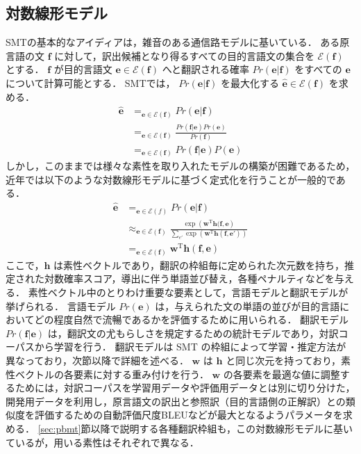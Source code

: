 \documentclass[japanese]{jnlp_1.4}
\newcommand{\argmax}{}
\begin{document}
\subsection{対数線形モデル}
\label{sec:log-linear}

SMTの基本的なアイディアは，雑音のある通信路モデル\cite{shannon48}に基いている．
ある原言語の文 $\bm{f}$ に対して，訳出候補となり得るすべての目的言語文の集合を $\mathcal{E}(\bm{f})$ とする．
$\bm{f}$ が目的言語文 $\bm{e} \in \mathcal{E}(\bm{f})$ へと翻訳される確率 $Pr(\bm{e}|\bm{f})$ をすべての $\bm{e}$ について計算可能とする．
SMTでは， $Pr(\bm{e}|\bm{f})$ を最大化する $\hat{\bm{e}} \in \mathcal{E}(\bm{f})$ を求める．
\begin{align}
\hat{\bm{e}} & = \argmax_{\bm{e} \in \mathcal{E}(\bm{f})} Pr(\bm{e}|\bm{f}) \label{eqn:decode} \\
& = \argmax_{\bm{e} \in \mathcal{E}(\bm{f})} \frac{Pr(\bm{f}|\bm{e})Pr(\bm{e})}{Pr(\bm{f})} \\
& = \argmax_{\bm{e} \in \mathcal{E}(\bm{f})} Pr(\bm{f}|\bm{e})P(\bm{e}) \label{eqn:bayes}
\end{align}
しかし，このままでは様々な素性を取り入れたモデルの構築が困難であるため，近年では以下のような対数線形モデルに基づく定式化を行うことが一般的である\cite{och03mert}．
\begin{align}
\hat{\bm{e}} & = \argmax_{\bm{e} \in \mathcal{E}(f)} Pr(\bm{e}|\bm{f}) \\
& \approx \argmax_{\bm{e} \in \mathcal{E}(\bm{f})} \frac{\exp\left(\bm{w}^{\mathrm{T}} \bm{h}(\bm{f},\bm{e}\right)}{\sum_{e'}\limits \exp\left(\bm{w}^{\mathrm{T}}\bm{h}(\bm{f},\bm{e'})\right)} \\
& = \argmax_{\bm{e} \in \mathcal{E}(\bm{f})} \bm{w}^{\mathrm{T}} \bm{h}(\bm{f},\bm{e}) \label{eqn:log-linear}
\end{align}
ここで，$\bm{h}$ は素性ベクトルであり，翻訳の枠組毎に定められた次元数を持ち，推定された対数確率スコア，導出に伴う単語並び替え，各種ペナルティなどを与える．
素性ベクトル中のとりわけ重要な要素として，言語モデルと翻訳モデルが挙げられる．
言語モデル $Pr(\bm{e})$ は，与えられた文の単語の並びが目的言語においてどの程度自然で流暢であるかを評価するために用いられる．
翻訳モデル $Pr(\bm{f}|\bm{e})$ は，翻訳文の尤もらしさを規定するための統計モデルであり，対訳コーパスから学習を行う．
翻訳モデルは SMT の枠組によって学習・推定方法が異なっており，次節以降で詳細を述べる．
$\bm{w}$ は $\bm{h}$ と同じ次元を持っており，素性ベクトルの各要素に対する重み付けを行う．
$\bm{w}$ の各要素を最適な値に調整するためには，対訳コーパスを学習用データや評価用データとは別に切り分けた，開発用データを利用し，原言語文の訳出と参照訳（目的言語側の正解訳）との類似度を評価するための自動評価尺度BLEU\cite{papineni02}などが最大となるようパラメータを求める\cite{och03mert}．
\ref{sec:pbmt}節以降で説明する各種翻訳枠組も，この対数線形モデルに基いているが，用いる素性はそれぞれで異なる．
\end{document}

